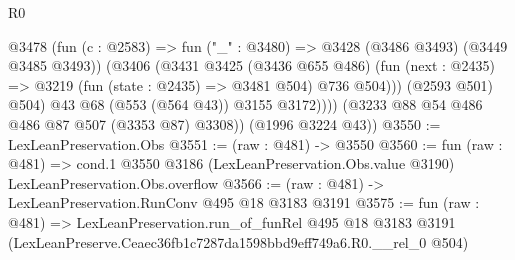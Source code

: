 \begin{lexlean}{R0}
\begin{coremodule}
                @3478
                  (fun (c : @2583) => fun ("_" : @3480) => @3428 (@3486 @3493) (@3449 @3485 @3493))
                  (@3406
                    (@3431
                      @3425
                      (@3436 @655 @486)
                      (fun (next : @2435) => @3219 (fun (state : @2435) => @3481 @504) @736 @504)))
                  (@2593 @501)
                  @504)
                @43
                @68
                (@553 (@564 @43))
                @3155
                @3172))))
        (@3233 @88 @54 @486 @486 @87 @507 (@3353 @87) @3308))
      (@1996 @3224 @43))
@3550 := LexLeanPreservation.Obs
@3551 := (raw : @481) -> @3550
@3560 := fun (raw : @481) =>
  cond.{1} @3550 @3186 (LexLeanPreservation.Obs.value @3190) LexLeanPreservation.Obs.overflow
@3566 := (raw : @481) -> LexLeanPreservation.RunConv @495 @18 @3183 @3191
@3575 := fun (raw : @481) =>
  LexLeanPreservation.run_of_funRel
    @495
    @18
    @3183
    @3191
    (LexLeanPreserve.Ceaec36fb1c7287da1598bbd9eff749a6.R0.__rel_0 @504)
\end{coremodule}
\end{lexlean}
